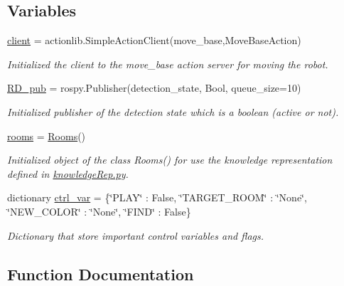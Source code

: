 \subsection*{Variables}
\begin{DoxyCompactItemize}
\item 
\hyperlink{namespacecmdManager_ad1967c9cd71b2174a9b4c56d32f08fcc}{client} = actionlib.\+Simple\+Action\+Client(\textquotesingle{}move\+\_\+base\textquotesingle{},Move\+Base\+Action)
\begin{DoxyCompactList}\small\item\em Initialized the client to the move\+\_\+base action server for moving the robot. \end{DoxyCompactList}\item 
\hyperlink{namespacecmdManager_a5f10b08efaeaad88cf34e075895f4d9d}{R\+D\+\_\+pub} = rospy.\+Publisher(\textquotesingle{}detection\+\_\+state\textquotesingle{}, Bool, queue\+\_\+size=10)
\begin{DoxyCompactList}\small\item\em Initialized publisher of the detection state which is a boolean (active or not). \end{DoxyCompactList}\item 
\hyperlink{namespacecmdManager_a783b0ef84682af39dc9f2b8e828c4ad9}{rooms} = \hyperlink{classknowledgeRep_1_1Rooms}{Rooms}()
\begin{DoxyCompactList}\small\item\em Initialized object of the class Rooms() for use the knowledge representation defined in \hyperlink{knowledgeRep_8py}{knowledge\+Rep.\+py}. \end{DoxyCompactList}\item 
dictionary \hyperlink{namespacecmdManager_a927e4211865b745599afe42e9e8d7c8e}{ctrl\+\_\+var} = \{\char`\"{}P\+L\+AY\char`\"{} \+: False, \char`\"{}T\+A\+R\+G\+E\+T\+\_\+\+R\+O\+OM\char`\"{} \+: \char`\"{}None\char`\"{}, \char`\"{}N\+E\+W\+\_\+\+C\+O\+L\+OR\char`\"{} \+: \char`\"{}None\char`\"{}, \char`\"{}F\+I\+ND\char`\"{} \+: False\}
\begin{DoxyCompactList}\small\item\em Dictionary that store important control variables and flags. \end{DoxyCompactList}\end{DoxyCompactItemize}


\subsection{Function Documentation}

